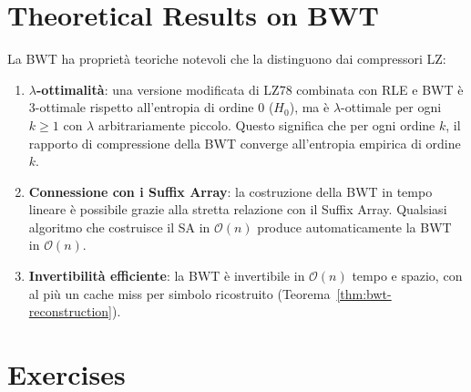 \documentclass[12pt, a4paper, oneside]{book}
\theoremstyle{plain}
\theoremstyle{definition}
\theoremstyle{remark}
\newcommand{\OO}[1]{\mathcal{O}\!\left(#1\right)}
\newcommand{\Hz}{H_0}
\begin{document}
\section{Theoretical Results on BWT}
\label{sec:bwt-theory}

La BWT ha proprietà teoriche notevoli che la distinguono dai compressori LZ:

\begin{enumerate}
  \item \textbf{$\lambda$-ottimalità}: una versione modificata di LZ78 combinata con RLE e BWT è 3-ottimale rispetto all'entropia di ordine 0 ($\Hz$), ma è $\lambda$-ottimale per ogni $k \ge 1$ con $\lambda$ arbitrariamente piccolo. Questo significa che per ogni ordine $k$, il rapporto di compressione della BWT converge all'entropia empirica di ordine $k$.

  \item \textbf{Connessione con i Suffix Array}: la costruzione della BWT in tempo lineare è possibile grazie alla stretta relazione con il Suffix Array. Qualsiasi algoritmo che costruisce il SA in $\OO{n}$ produce automaticamente la BWT in $\OO{n}$.

  \item \textbf{Invertibilità efficiente}: la BWT è invertibile in $\OO{n}$ tempo e spazio, con al più un cache miss per simbolo ricostruito (Teorema~\ref{thm:bwt-reconstruction}).
\end{enumerate}

\section{Exercises}
\end{document}
